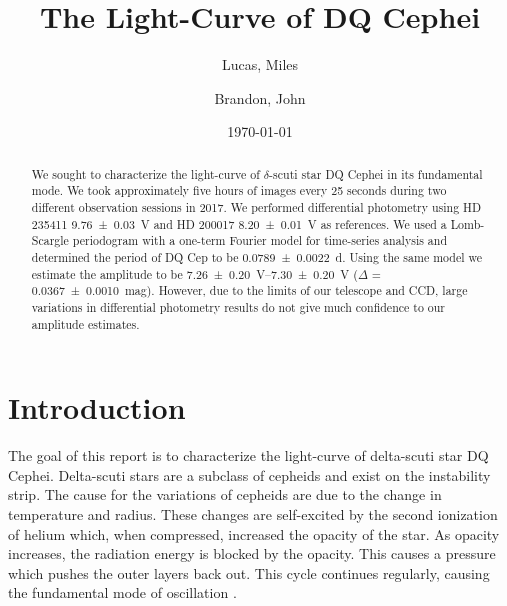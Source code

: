 \documentclass[%
aip,
jmp,
reprint,
floatfix,
nofootinbib
]{revtex4-1}
\begin{document}
	
	\title[Light-Curve of DQ Cephei]{The Light-Curve of DQ Cephei}
	
	\author{Lucas, Miles}
	\author{Brandon, John}
	
	\date{\today}
	
	

	\begin{abstract}
	We sought to characterize the light-curve of $\delta$-scuti star DQ Cephei in its fundamental mode. We took approximately five hours of images every 25 seconds during two different observation sessions in 2017. We performed differential photometry using HD 235411 \SI{9.76\pm.03}{V} and HD 200017 \SI{8.20\pm.01}{V} as references. We used a Lomb-Scargle periodogram with a one-term Fourier model for time-series analysis and determined the period of DQ Cep to be \SI{0.0789\pm.0022}{\day}. Using the same model we estimate the amplitude to be \SIrange{7.26\pm.20}{7.30\pm.20}{V} ($\Delta$ = \SI{.0367\pm.0010}{mag}). However, due to the limits of our telescope and CCD, large variations in differential photometry results do not give much confidence to our amplitude estimates. 
		
	\end{abstract}
	
	\maketitle
	

	\section{Introduction}
	
	The goal of this report is to characterize the light-curve of delta-scuti star DQ Cephei. Delta-scuti stars are a subclass of cepheids and exist on the instability strip. The cause for the variations of cepheids are due to the change in temperature and radius. These changes are self-excited by the second ionization of helium \citep{1963ApJ...138..487C} which, when compressed, increased the opacity of the star. As opacity increases, the radiation energy is blocked by the opacity. This causes a pressure which pushes the outer layers back out. This cycle continues regularly, causing the fundamental mode of oscillation \citep{1935PASP...47..232F}. 
	
\end{document}
